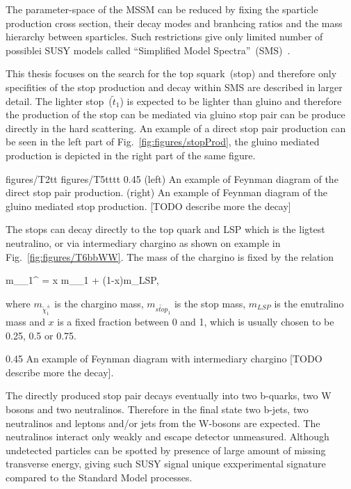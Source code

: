 The parameter-space of the MSSM can be reduced by fixing the sparticle production cross section, their decay modes and branhcing ratios and the mass hierarchy between sparticles. Such restrictions give only limited number of possiblei SUSY models called ``Simplified Model Spectra''~(SMS)~\cite{Alves:2011wf, Alwall:2008ag, Chatrchyan:2013sza}.

This thesis focuses on the search for the top squark~(stop) and therefore only specifities of the stop production and decay within SMS are described in larger detail. The lighter stop~($\tilde{t}_{1}$) is expected to be lighter than gluino and therefore the production of the stop can be mediated via gluino stop pair can be produce directly in the hard scattering. An example of a direct stop pair production can be seen in the left part of Fig.~\ref{fig:figures/stopProd}, the gluino mediated production is depicted in the right part of the same figure.


                 {figures/T2tt}
                 {figures/T5tttt} %
                 {0.45}       %
                 {(left) An example of Feynman diagram of the direct stop pair production. (right)  An example of Feynman diagram of the gluino mediated stop production.  [TODO describe more the decay]  } %

The stops can decay directly to the top quark and LSP which is the ligtest neutralino, or via intermediary chargino as shown on example in Fig.~\ref{fig:figures/T6bbWW}. The mass of the chargino is fixed by the relation

{
m_{\tilde{\chi}_{1}^{\pm}} = x m_{_{1}} + (1-x)m_{LSP},
}

where $m_{\tilde{\chi}_{1}^{\pm}}$ is the chargino mass, $m_{\tilde{stop}_{1}}$ is the stop mass, $m_{LSP}$ is the enutralino mass and $x$ is a fixed fraction between 0 and 1, which is usually chosen to be 0.25, 0.5 or 0.75. 

                 {0.45}       %
                 {An example of Feynman diagram with intermediary chargino [TODO describe more the decay].   } %

The directly produced stop pair decays eventually into two b-quarks, two W bosons and two neutralinos. Therefore in the final state two b-jets, two neutralinos and leptons and/or jets from the W-bosons are expected. The neutralinos interact only weakly and escape detector unmeasured. Although undetected particles can be spotted by presence of large amount of missing transverse energy, giving such SUSY signal unique exxperimental signature compared to the Standard Model processes.


